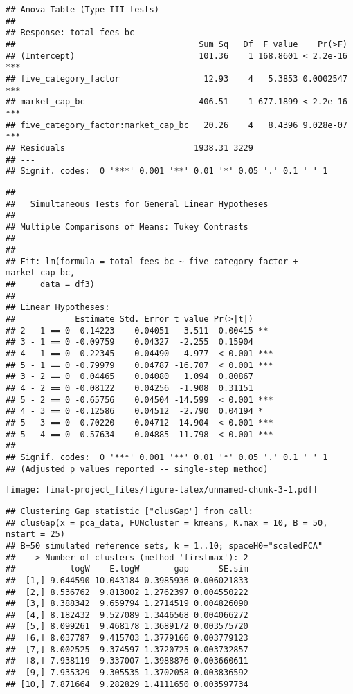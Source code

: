 \documentclass[
]{article}
\begin{document}
\begin{verbatim}
## Anova Table (Type III tests)
## 
## Response: total_fees_bc
##                                     Sum Sq   Df  F value    Pr(>F)    
## (Intercept)                         101.36    1 168.8601 < 2.2e-16 ***
## five_category_factor                 12.93    4   5.3853 0.0002547 ***
## market_cap_bc                       406.51    1 677.1899 < 2.2e-16 ***
## five_category_factor:market_cap_bc   20.26    4   8.4396 9.028e-07 ***
## Residuals                          1938.31 3229                       
## ---
## Signif. codes:  0 '***' 0.001 '**' 0.01 '*' 0.05 '.' 0.1 ' ' 1
\end{verbatim}

\begin{verbatim}
## 
##   Simultaneous Tests for General Linear Hypotheses
## 
## Multiple Comparisons of Means: Tukey Contrasts
## 
## 
## Fit: lm(formula = total_fees_bc ~ five_category_factor + market_cap_bc, 
##     data = df3)
## 
## Linear Hypotheses:
##            Estimate Std. Error t value Pr(>|t|)    
## 2 - 1 == 0 -0.14223    0.04051  -3.511  0.00415 ** 
## 3 - 1 == 0 -0.09759    0.04327  -2.255  0.15904    
## 4 - 1 == 0 -0.22345    0.04490  -4.977  < 0.001 ***
## 5 - 1 == 0 -0.79979    0.04787 -16.707  < 0.001 ***
## 3 - 2 == 0  0.04465    0.04080   1.094  0.80867    
## 4 - 2 == 0 -0.08122    0.04256  -1.908  0.31151    
## 5 - 2 == 0 -0.65756    0.04504 -14.599  < 0.001 ***
## 4 - 3 == 0 -0.12586    0.04512  -2.790  0.04194 *  
## 5 - 3 == 0 -0.70220    0.04712 -14.904  < 0.001 ***
## 5 - 4 == 0 -0.57634    0.04885 -11.798  < 0.001 ***
## ---
## Signif. codes:  0 '***' 0.001 '**' 0.01 '*' 0.05 '.' 0.1 ' ' 1
## (Adjusted p values reported -- single-step method)
\end{verbatim}

\texttt{[image: final-project\_files/figure-latex/unnamed-chunk-3-1.pdf]}

\begin{verbatim}
## Clustering Gap statistic ["clusGap"] from call:
## clusGap(x = pca_data, FUNcluster = kmeans, K.max = 10, B = 50,     nstart = 25)
## B=50 simulated reference sets, k = 1..10; spaceH0="scaledPCA"
##  --> Number of clusters (method 'firstmax'): 2
##           logW    E.logW       gap      SE.sim
##  [1,] 9.644590 10.043184 0.3985936 0.006021833
##  [2,] 8.536762  9.813002 1.2762397 0.004550222
##  [3,] 8.388342  9.659794 1.2714519 0.004826090
##  [4,] 8.182432  9.527089 1.3446568 0.004066272
##  [5,] 8.099261  9.468178 1.3689172 0.003575720
##  [6,] 8.037787  9.415703 1.3779166 0.003779123
##  [7,] 8.002525  9.374597 1.3720725 0.003732857
##  [8,] 7.938119  9.337007 1.3988876 0.003660611
##  [9,] 7.935329  9.305535 1.3702058 0.003836592
## [10,] 7.871664  9.282829 1.4111650 0.003597734
\end{verbatim}
\end{document}
